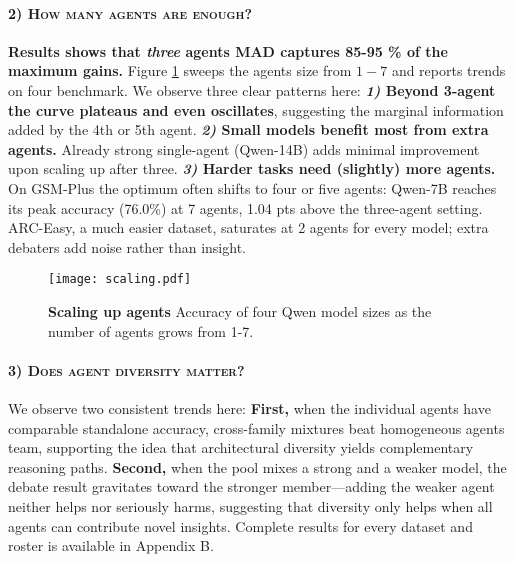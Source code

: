 \documentclass[11pt]{article}
\begin{document}
\paragraph{\textsc{2) How many agents are enough?}} 

\textbf{Results shows that \emph{three} agents MAD captures 85-95 \% of the maximum gains.} Figure \ref{fig:scaling_mad} sweeps the agents size from $1 - 7$ and reports trends on four benchmark. We observe three clear patterns here: \textbf{\textit{1)} Beyond 3-agent the curve plateaus and even oscillates}, suggesting the marginal information added by the 4th or 5th agent. \textbf{\textit{2)} Small models benefit most from extra agents.} Already strong single-agent (Qwen-14B) adds minimal improvement upon scaling up after three. \textbf{\textit{3)} Harder tasks need (slightly) more agents.} On GSM-Plus the optimum often shifts to four or five agents: Qwen-7B reaches its peak accuracy (76.0\%) at 7 agents, 1.04 pts above the three-agent setting. ARC-Easy, a much easier dataset, saturates at 2 agents for every model; extra debaters add noise rather than insight.



\begin{figure}[t]
    \centering
    \texttt{[image: scaling.pdf]}
    \caption{\textbf{Scaling up agents}  
    Accuracy of four Qwen model sizes as the number of agents grows from 1-7. }
    \label{fig:scaling_mad}
\end{figure}


\paragraph{\textsc{3) Does agent diversity matter?}} We observe two consistent trends here: \textbf{First,} when the individual agents have comparable standalone accuracy, cross-family mixtures beat homogeneous agents team, supporting the idea that architectural diversity yields complementary reasoning paths. \textbf{Second,} when the pool mixes a strong and a weaker model, the debate result gravitates toward the stronger member—adding the weaker agent neither helps nor seriously harms, suggesting that diversity only helps when all agents can contribute novel insights. Complete results for every dataset and roster is available in Appendix B.
\end{document}
